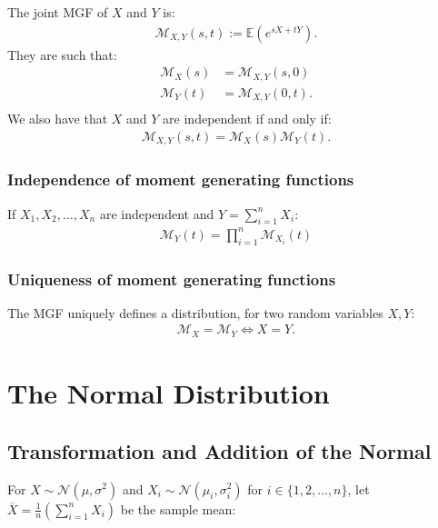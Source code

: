 \documentclass[a4paper, 12pt, twoside]{article}
\begin{document}
The joint MGF of $X$ and $Y$ is:
\begin{align*}
    \mathcal{M}_{X, Y}(s, t) := \mathbb{E}(e^{sX + tY}).
\end{align*}
They are such that:
\begin{align*}
    \mathcal{M}_X(s) & = \mathcal{M}_{X, Y}(s, 0)  \\
    \mathcal{M}_Y(t) & = \mathcal{M}_{X, Y}(0, t). \\
\end{align*}
We also have that $X$ and $Y$ are independent if and only if:
\begin{align*}
    \mathcal{M}_{X, Y}(s, t) = \mathcal{M}_X(s)\mathcal{M}_Y(t).
\end{align*}

\subsubsection{Independence of moment generating functions}

If $X_1, X_2, \ldots, X_n$ are independent and $Y = \sum_{i = 1}^n X_i$:
\begin{align*}
    \mathcal{M}_Y(t) = \prod_{i = 1}^n \mathcal{M}_{X_i}(t)
\end{align*}

\subsubsection{Uniqueness of moment generating functions}

The MGF uniquely defines a distribution, for two random variables $X, Y$:
\begin{align*}
    \mathcal{M}_X = \mathcal{M}_Y \Leftrightarrow X = Y.
\end{align*}

\newpage

\section{The Normal Distribution}

\subsection{Transformation and Addition of the Normal}

For $X \sim \mathcal{N}(\mu, \sigma^2)$ and $X_i \sim
    \mathcal{N}(\mu_i, \sigma_i^2)$ for $i \in \{1, 2, \ldots, n\}$,
let $\overline{X} = \frac{1}{n}(\sum_{i = 1}^n X_i)$ be the sample mean:
\end{document}
